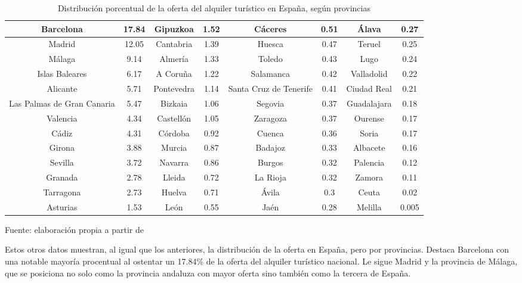 \documentclass[a4paper,10pt]{article}
\begin{document}
            \begin{table}[ht]
                \begin{center}
                \begin{tabular}{| c | c | c | c | c | c | c | c |}
                    \hline
                    Barcelona  & 17.84 & Gipuzkoa & 1.52 & Cáceres & 0.51 & Álava & 0.27 \\ \hline
                    Madrid & 12.05 & Cantabria & 1.39 & Huesca & 0.47 & Teruel & 0.25 \\ \hline
                    Málaga  & 9.14 & Almería & 1.33 & Toledo & 0.43 & Lugo & 0.24 \\ \hline
                    Islas Baleares & 6.17 & A Coruña & 1.22 & Salamanca & 0.42 & Valladolid & 0.22 \\ \hline
                    Alicante & 5.71 & Pontevedra & 1.14 & Santa Cruz de Tenerife & 0.41 & Ciudad Real & 0.21 \\ \hline
                    Las Palmas de Gran Canaria & 5.47 & Bizkaia  & 1.06 & Segovia & 0.37 & Guadalajara & 0.18 \\ \hline
                    Valencia & 4.34 & Castellón & 1.05 & Zaragoza & 0.37 & Ourense & 0.17 \\ \hline
                    Cádiz  & 4.31 & Córdoba  & 0.92 & Cuenca & 0.36  & Soria & 0.17 \\ \hline
                    Girona  & 3.88 & Murcia & 0.87 & Badajoz & 0.33 & Albacete & 0.16 \\ \hline
                    Sevilla &  3.72 & Navarra & 0.86 & Burgos & 0.32 & Palencia & 0.12 \\ \hline
                    Granada  & 2.78 & Lleida & 0.72 & La Rioja & 0.32 & Zamora & 0.11 \\ \hline
                    Tarragona & 2.73 & Huelva & 0.71 & Ávila & 0.3 & Ceuta & 0.02 \\ \hline
                    Asturias & 1.53 & León & 0.55 & Jaén & 0.28 & Melilla & 0.005 \\ \hline
                \end{tabular}
                \begin{flushright}
                    \footnotesize{Fuente: elaboración propia a partir de \cite[(1)]{datahippo}}
                \end{flushright}
                \caption{Distribución porcentual de la oferta del alquiler turístico en España, según provincias}
                \end{center}
                Estos otros datos muestran, al igual que los anteriores, la distribución de la oferta en España, pero por provincias. 
                Destaca Barcelona con una notable mayoría procentual al ostentar un 17.84\% de la oferta del alquiler turístico nacional.
                Le sigue Madrid y la provincia de Málaga, que se posiciona no solo como la provincia andaluza con mayor oferta sino también 
                como la tercera de España.
            \end{table}
\end{document}
